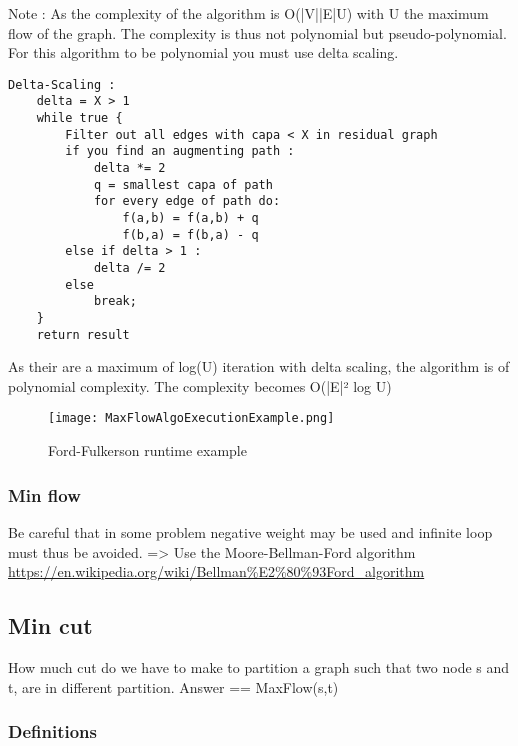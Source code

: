 Note : As the complexity of the algorithm is O(|V||E|U) with U the
maximum flow of the graph. The complexity is thus not polynomial but
pseudo-polynomial. For this algorithm to be polynomial you must use
delta scaling.

\begin{lstlisting}
Delta-Scaling :
    delta = X > 1
    while true {
        Filter out all edges with capa < X in residual graph
        if you find an augmenting path :
            delta *= 2
            q = smallest capa of path
            for every edge of path do:
                f(a,b) = f(a,b) + q
                f(b,a) = f(b,a) - q
        else if delta > 1 :
            delta /= 2
        else
            break;
    }
    return result
\end{lstlisting}

As their are a maximum of log(U) iteration with delta scaling, the algorithm is of polynomial complexity. The complexity becomes O(|E|² log U)

\begin{figure}[!ht]
    \centering
    \texttt{[image: MaxFlowAlgoExecutionExample.png]}
    \caption{Ford-Fulkerson runtime example}
    \label{fig:Ford-Fulkerson_example}
\end{figure}

\subsubsection{Min flow}

\begin{figure}[!ht]
    \centering
\end{figure}

Be careful that in some problem negative weight may be used and infinite loop must thus be avoided. => Use the Moore-Bellman-Ford algorithm \url{https://en.wikipedia.org/wiki/Bellman%E2%80%93Ford_algorithm} 

\subsection{Min cut}

How much cut do we have to make to partition a graph such that two node s and t, are in different partition. Answer == MaxFlow(s,t)

\subsubsection{Definitions}

